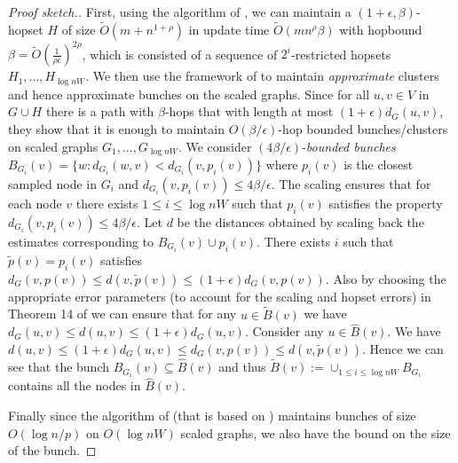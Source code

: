 \documentclass[11pt]{article}
\theoremstyle{definition}
\theoremstyle{remark}
\newcommand{\ttodo}[1]{\todo[color=orange!20]{T: #1}}
\begin{document}
\lmbunch*
\begin{proof}[Proof sketch.]
First, using the algorithm of \cite{LN2020}, we can maintain a $(1+\epsilon, \beta)$-hopset $H$ of size $\tilde{O}(m+n^{1+\rho})$ in update time $\tilde{O}(mn^{\rho} \beta)$ with hopbound $\beta =\tilde{O}(\frac{1}{\rho\epsilon})^{2\rho}$, which is consisted of a sequence of $2^i$-restricted hopsets $H_1,...,H_{\log nW}$. We then use the framework of \cite{LN2020} to maintain \textit{approximate} clusters and hence approximate bunches on the scaled graphs. Since for all $u,v \in V$ in $G \cup H$ there is a path with $\beta$-hops that with length at most $(1+\epsilon)d_G(u,v)$, they show that it is enough to maintain $O(\beta/\epsilon)$-hop bounded bunches/clusters on scaled graphs $G_1,...,G_{\log n W}$. We consider $(4\beta/\epsilon)$-\textit{bounded bunches} $B_{G_i}(v)= \{ w: d_{G_i}(w,v) < d_{G_i}(v, p_i(v))\}$ where $p_i(v)$ is the closest sampled node in $G_i$ and $d_{G_i}(v, p_i(v)) \leq 4\beta/\epsilon$. The scaling ensures that for each node $v$ there exists $1 \leq i \leq \log nW$ such that $p_i(v)$ satisfies the property $d_{G_i}(v, p_i(v)) \leq 4\beta/\epsilon$. Let $d$ be the distances obtained by scaling back the estimates corresponding to $B_{G_i}(v) \cup p_i(v)$. There exists $i$ such that  $\tilde{p}(v) =p_i(v)$ satisfies $d_G(v,p(v)) \leq d(v,\tilde{p}(v)) \leq (1+\epsilon) d_G(v,p(v))$. Also by choosing the appropriate error parameters (to account for the scaling and hopset errors) in Theorem 14 of \cite{LN2020} we can ensure that for any $u \in \tilde{B}(v)$ we have $d_G(u,v) \leq d(u,v) \leq (1+\epsilon) d_G(u,v)$.
Consider any $u \in \hat{B}(v)$. We have $d(u,v) \leq (1+\epsilon)d_G(u,v) \leq d_G(v,p(v)) \leq d(v, \tilde{p}(v))$.
Hence we can see that the bunch $B_{G_i}(v) \subseteq \hat{B}(v)$ and thus $\tilde{B}(v):=\cup_{1 \leq i \leq \log nW} B_{G_i}$ contains all the nodes in $\hat{B}(v)$.

Finally since the algorithm of \cite{LN2020} (that is based on \cite{RZ12}) maintains bunches of size $O(\log n/p)$ on $O(\log nW)$ scaled graphs, we also have the bound on the size of the bunch.
\end{proof}



\end{document}
